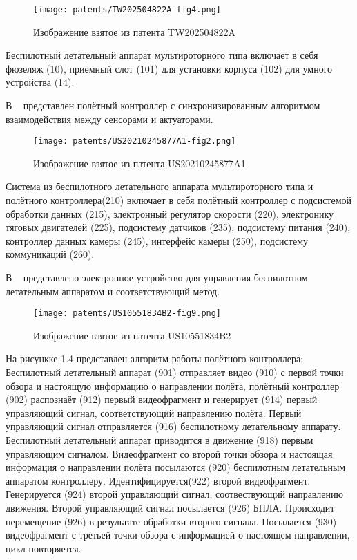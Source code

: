 \begin{figure}[H]
  \centering
  \texttt{[image: patents/TW202504822A-fig4.png]}
  \caption{Изображение взятое из патента TW202504822A}
\end{figure}


Беспилотный летательный аппарат мультироторного типа включает в
себя фюзеляж (10), приёмный слот (101) для установки корпуса (102) для
умного устройства (14).

В ~\cite{US20210245877A1} представлен полётный контроллер с
синхронизированным алгоритмом взаимодействия между сенсорами и
актуаторами.

\begin{figure}[H]
  \centering
  \texttt{[image: patents/US20210245877A1-fig2.png]}
  \caption{Изображение взятое из патента US20210245877A1}
\end{figure}

Система из беспилотного летательного аппарата мультироторного типа и
полётного контроллера(210) включает в себя полётный контроллер с
подсистемой обработки данных (215), электронный регулятор скорости
(220), электронику тяговых двигателей (225), подсистему датчиков
(235), подсистему питания (240), контроллер данных камеры (245),
интерфейс камеры (250), подсистему коммуникаций (260).

В ~\cite{US10551834B2} представлено электронное устройство для
управления беспилотном летательным аппаратом и соответствующий метод.

\begin{figure}[H]
  \centering
  \texttt{[image: patents/US10551834B2-fig9.png]}
  \caption{Изображение взятое из патента US10551834B2}
\end{figure}

На рисункке 1.4 представлен алгоритм работы полётного контроллера:
Беспилотный летательный аппарат (901) отправляет видео (910) с первой
точки обзора и настоящую информацию о направлении полёта, полётный
контроллер (902) распознаёт (912) первый видеофрагмент и генерирует
(914) первый управляющий сигнал, соответствующий направлению полёта.
Первый управляющий сигнал отправляется (916) беспилотному летательному
аппарату. Беспилотный летательный аппарат приводится в движение (918)
первым управляющим сигналом.
Видеофрагмент со второй точки обзора и настоящая информация о
направлении полёта посылаются (920) беспилотным летательным аппаратом
контроллеру. Идентифицируется(922) второй видеофрагмент. Генерируется
(924) второй управляющий сигнал, соотвествующий направлению движения.
Второй управляющий сигнал посылается (926) БПЛА.
Происходит перемещение (926) в результате обработки второго сигнала.
Посылается (930) видеофрагмент с третьей точки обзора с информацией о
настоящем направлении, цикл повторяется.

